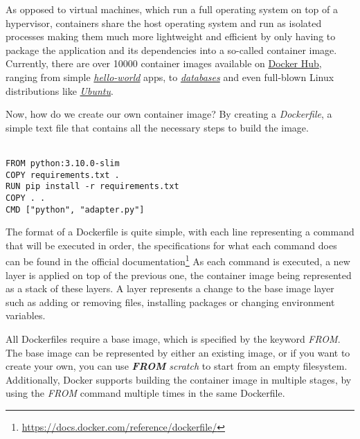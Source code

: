 
As opposed to virtual machines, which run a full operating system on top of a hypervisor, containers share the host operating system and run as isolated processes
making them much more lightweight and efficient by only having to package the application and its dependencies into a so-called container image.
Currently, there are over 10000 container images available on \href{https://hub.docker.com/}{Docker Hub}, ranging from simple \href{https://hub.docker.com/_/hello-world}{\textit{hello-world}} apps, to 
\href{https://hub.docker.com/search?categories=Databases+\%26+Storage}{\textit{databases}} and even full-blown Linux distributions like \href{https://hub.docker.com/_/ubuntu}{\textit{Ubuntu}}.

Now, how do we create our own container image? By creating a \textit{Dockerfile}, a simple text file that contains all the necessary steps to build the image.\\\\

\lstset{language=Dockerfile,caption=Sample Dockerfile,label=lst:ex-dockerfile}
\begin{lstlisting}
FROM python:3.10.0-slim
COPY requirements.txt .
RUN pip install -r requirements.txt
COPY . .
CMD ["python", "adapter.py"]    
\end{lstlisting}

The format of a Dockerfile is quite simple, with each line representing a command that will be executed in order, the specifications for what each command does can be found in the official documentation\footnote[1]{\href{https://docs.docker.com/reference/dockerfile/}{https://docs.docker.com/reference/dockerfile/}}
As each command is executed, a new layer is applied on top of the previous one, the container image being represented as a stack of these layers. A layer represents a change to the base image layer such as adding or removing files, installing packages or changing environment variables.


All Dockerfiles require a base image, which is specified by the keyword \textit{FROM}.
The base image can be represented by either an existing image, or if you want to create your own, you can use \textit{\textbf{FROM} scratch} to start from an empty filesystem.
Additionally, Docker supports building the container image in multiple stages, by using the \textit{FROM} command multiple times in the same Dockerfile.

